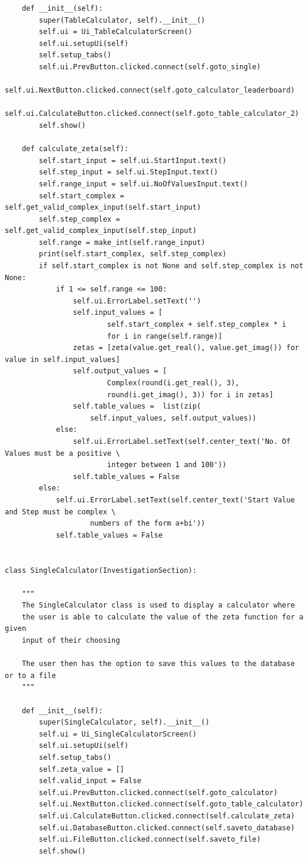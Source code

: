 \documentclass{article}
\begin{document}
\begin{lstlisting}
    def __init__(self):
        super(TableCalculator, self).__init__()
        self.ui = Ui_TableCalculatorScreen()
        self.ui.setupUi(self)
        self.setup_tabs()
        self.ui.PrevButton.clicked.connect(self.goto_single)
        self.ui.NextButton.clicked.connect(self.goto_calculator_leaderboard)
        self.ui.CalculateButton.clicked.connect(self.goto_table_calculator_2)
        self.show()

    def calculate_zeta(self):
        self.start_input = self.ui.StartInput.text()
        self.step_input = self.ui.StepInput.text()
        self.range_input = self.ui.NoOfValuesInput.text()
        self.start_complex = self.get_valid_complex_input(self.start_input)
        self.step_complex = self.get_valid_complex_input(self.step_input)
        self.range = make_int(self.range_input)
        print(self.start_complex, self.step_complex)
        if self.start_complex is not None and self.step_complex is not None:
            if 1 <= self.range <= 100:
                self.ui.ErrorLabel.setText('')
                self.input_values = [
                        self.start_complex + self.step_complex * i
                        for i in range(self.range)]
                zetas = [zeta(value.get_real(), value.get_imag()) for value in self.input_values]
                self.output_values = [
                        Complex(round(i.get_real(), 3),
                        round(i.get_imag(), 3)) for i in zetas]
                self.table_values =  list(zip(
                    self.input_values, self.output_values))
            else:
                self.ui.ErrorLabel.setText(self.center_text('No. Of Values must be a positive \
                        integer between 1 and 100'))
                self.table_values = False
        else:
            self.ui.ErrorLabel.setText(self.center_text('Start Value and Step must be complex \
                    numbers of the form a+bi'))
            self.table_values = False


class SingleCalculator(InvestigationSection):

    """
    The SingleCalculator class is used to display a calculator where
    the user is able to calculate the value of the zeta function for a given
    input of their choosing

    The user then has the option to save this values to the database or to a file
    """

    def __init__(self):
        super(SingleCalculator, self).__init__()
        self.ui = Ui_SingleCalculatorScreen()
        self.ui.setupUi(self)
        self.setup_tabs()
        self.zeta_value = []
        self.valid_input = False
        self.ui.PrevButton.clicked.connect(self.goto_calculator)
        self.ui.NextButton.clicked.connect(self.goto_table_calculator)
        self.ui.CalculateButton.clicked.connect(self.calculate_zeta)
        self.ui.DatabaseButton.clicked.connect(self.saveto_database)
        self.ui.FileButton.clicked.connect(self.saveto_file)
        self.show()


\end{lstlisting}
\end{document}
